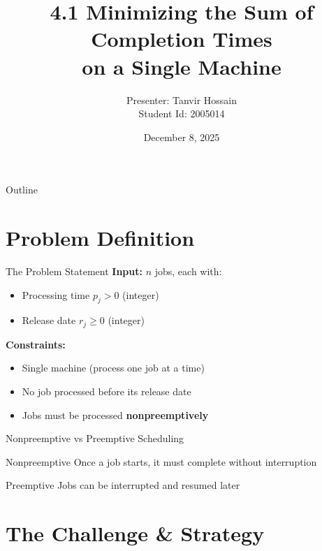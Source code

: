 \documentclass[aspectratio=169, 12pt]{beamer}
\title[Minimizing Sum of Completion Times]{4.1 Minimizing the Sum of Completion Times \\ on a Single Machine}
\author[Tanvir (2005014)]{Presenter: Tanvir Hossain \\ Student Id: 2005014}
\date{December 8, 2025}
\begin{document}
\begin{frame}
    \titlepage
\end{frame}

\begin{frame}{Outline}
    \tableofcontents
\end{frame}

\section{Problem Definition}

\begin{frame}{The Problem Statement}
    \textbf{Input:} $n$ jobs, each with:
    \begin{itemize}
        \item<2-> Processing time $p_j > 0$ (integer)
        \item<3-> Release date $r_j \geq 0$ (integer)
    \end{itemize}

    \vspace{0.5cm}
    \textbf{Constraints:}
    \begin{itemize}
        \item<4-> Single machine (process one job at a time)
        \item<5-> No job processed before its release date
        \item<6-> Jobs must be processed \textbf{nonpreemptively}
    \end{itemize}

    \vspace{0.5cm}
\end{frame}

\begin{frame}{Nonpreemptive vs Preemptive Scheduling}
    \begin{block}{Nonpreemptive}
    Once a job starts, it must complete without interruption
    \end{block}

    \vspace{0.3cm}
    \begin{block}{Preemptive}
    Jobs can be interrupted and resumed later
    \end{block}
\end{frame}

\section{The Challenge \& Strategy}
\end{document}
